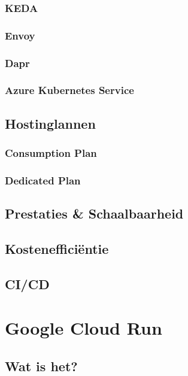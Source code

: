 \subsubsection{KEDA}

\subsubsection{Envoy}

\subsubsection{Dapr}

\subsubsection{Azure Kubernetes Service}

\subsection{Hostinglannen}

\subsubsection{Consumption Plan}

\subsubsection{Dedicated Plan}

\subsection{Prestaties \& Schaalbaarheid}

\subsection{Kostenefficiëntie}

\subsection{CI/CD}

\section{Google Cloud Run}

\subsection{Wat is het?}

